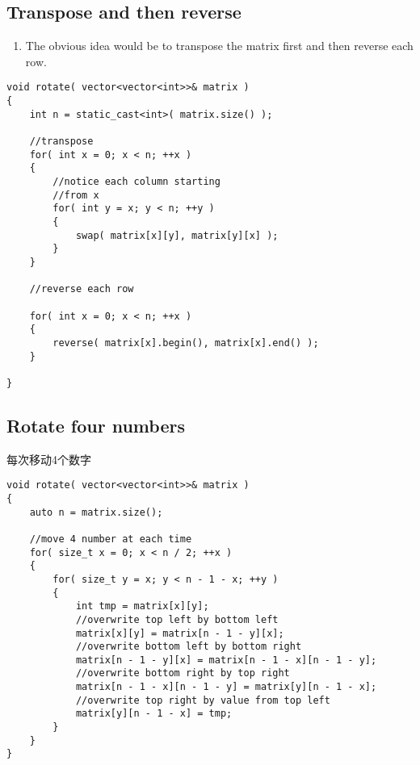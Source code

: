 \subsection{Transpose and then reverse}
\begin{enumerate}
\item The obvious idea would be to transpose the matrix first and then reverse each row. 
\end{enumerate}

\setcounter{lstlisting}{0}
\begin{lstlisting}[style=customc, caption={Transpose Then Reverse}]
void rotate( vector<vector<int>>& matrix )
{
    int n = static_cast<int>( matrix.size() );

    //transpose
    for( int x = 0; x < n; ++x )
    {
        //notice each column starting
        //from x
        for( int y = x; y < n; ++y )
        {
            swap( matrix[x][y], matrix[y][x] );
        }
    }

    //reverse each row

    for( int x = 0; x < n; ++x )
    {
        reverse( matrix[x].begin(), matrix[x].end() );
    }

}
\end{lstlisting}

\subsection{Rotate four numbers}
每次移动4个数字

\setcounter{lstlisting}{0}
\begin{lstlisting}[style=customc, caption={Rotate 4 Numbers Each Time}]
void rotate( vector<vector<int>>& matrix )
{
    auto n = matrix.size();

    //move 4 number at each time
    for( size_t x = 0; x < n / 2; ++x )
    {
        for( size_t y = x; y < n - 1 - x; ++y )
        {
            int tmp = matrix[x][y];
            //overwrite top left by bottom left
            matrix[x][y] = matrix[n - 1 - y][x];
            //overwrite bottom left by bottom right
            matrix[n - 1 - y][x] = matrix[n - 1 - x][n - 1 - y];
            //overwrite bottom right by top right
            matrix[n - 1 - x][n - 1 - y] = matrix[y][n - 1 - x];
            //overwrite top right by value from top left
            matrix[y][n - 1 - x] = tmp;
        }
    }
}
\end{lstlisting}